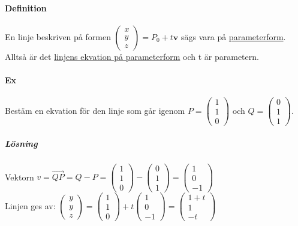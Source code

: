 \paragraph{Definition} En linje beskriven på formen $\begin{pmatrix}x\\y\\z\end{pmatrix}=P_{0}+t\bm{v}$ sägs vara på \underline{parameterform}.
Alltså är det \underline{linjens ekvation på parameterform} och t är parametern.

\paragraph{Ex} Bestäm en ekvation för den linje som går igenom $P=\begin{pmatrix}1\\1\\0\end{pmatrix}$ och $Q=\begin{pmatrix}0\\1\\1\end{pmatrix}$.
\subparagraph{Lösning} 
Vektorn $v=\overrightarrow{QP}=Q-P=\begin{pmatrix}1\\1\\0\end{pmatrix}-\begin{pmatrix}0\\1\\1\end{pmatrix}=\begin{pmatrix}1\\0\\-1\end{pmatrix}$\\
Linjen ges av: $\begin{pmatrix}y\\y\\z\end{pmatrix}=\begin{pmatrix}1\\1\\0\end{pmatrix}+t\begin{pmatrix}1\\0\\-1\end{pmatrix}=\begin{pmatrix}1+t\\1\\-t\end{pmatrix}$


